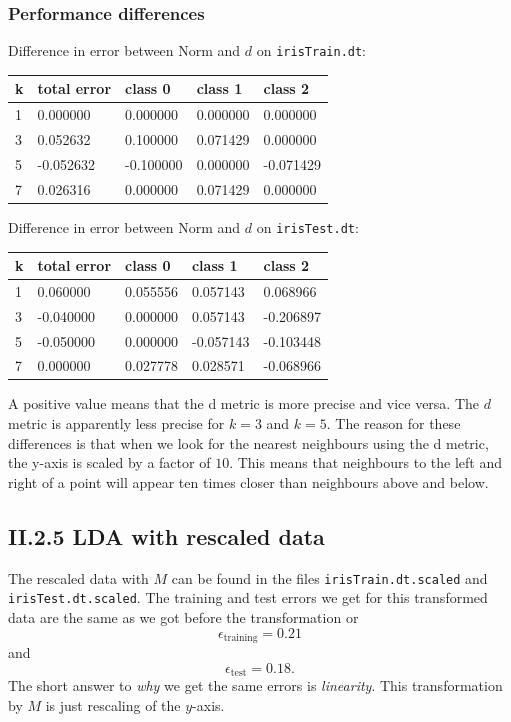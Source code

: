 \documentclass[a4paper,10pt]{article}
\begin{document}
\subsubsection*{Performance differences}
Difference in error between Norm and $d$ on \verb=irisTrain.dt=:\\
\begin{center}
\begin{tabular}{l|llll}
 k & total error & class 0 & class 1 & class 2\\ \hline
 1 & 0.000000 & 0.000000 & 0.000000 & 0.000000 \\
 3 & 0.052632 & 0.100000 & 0.071429 & 0.000000 \\
 5 & -0.052632 & -0.100000 & 0.000000 & -0.071429 \\
 7 & 0.026316 & 0.000000 & 0.071429 & 0.000000 \\
\end{tabular}
\end{center}

Difference in error between Norm and $d$ on \verb=irisTest.dt=:\\
\begin{center}
\begin{tabular}{l|llll}
 k & total error & class 0 & class 1 & class 2\\ \hline
 1 & 0.060000 & 0.055556 & 0.057143 & 0.068966 \\
 3 & -0.040000 & 0.000000 & 0.057143 & -0.206897 \\
 5 & -0.050000 & 0.000000 & -0.057143 & -0.103448 \\
 7 & 0.000000 & 0.027778 & 0.028571 & -0.068966 \\
\end{tabular}
\end{center}

A positive value means that the d metric is more precise and vice versa. The $d$ metric is apparently less precise for $k=3$ and $k=5$.
The reason for these differences is that when we look for the nearest
neighbours using the d metric, the y-axis is scaled by a factor of $10$. This means that neighbours to the left and right of a point will appear ten times
closer than neighbours above and below.



\subsection*{II.2.5 LDA with rescaled data}

The rescaled data with $M$ can be found in the files \verb=irisTrain.dt.scaled= and \verb=irisTest.dt.scaled=. The training and test errors we get for this transformed data are the same as we got before the transformation or 
$$\epsilon_{\text{training}} = 0.21$$
and
$$\epsilon_{\text{test}} = 0.18.$$
The short answer to \emph{why} we get the same errors is \emph{linearity}. This transformation by $M$ is just rescaling of the $y$-axis.
\end{document}
